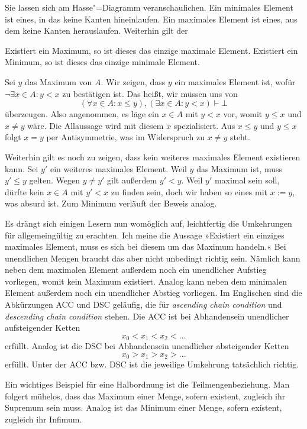 \noindent
Sie lassen sich am Hasse"=Diagramm veranschaulichen. Ein minimales
Element ist eines, in das keine Kanten hineinlaufen. Ein maximales
Element ist eines, aus dem keine Kanten herauslaufen. Weiterhin
gilt der

\begin{Satz}
Existiert ein Maximum, so ist dieses das einzige maximale Element.
Existiert ein Minimum, so ist dieses das einzige minimale Element.
\end{Satz}
\begin{Beweis}
Sei $y$ das Maximum von $A$. Wir zeigen, dass $y$ ein maximales
Element ist, wofür $\lnot\exists x\in A\colon y<x$ zu bestätigen ist.
Das heißt, wir müssen uns von
\[(\forall x\in A\colon x\le y),(\exists x\in A\colon y<x)\vdash\bot\]
überzeugen. Also angenommen, es läge ein $x\in A$ mit $y<x$ vor, womit
$y\le x$ und $x\ne y$ wäre. Die Allaussage wird mit diesem $x$
spezialisiert. Aus $x\le y$ und $y\le x$ folgt $x=y$ per Antisymmetrie,
was im Widerspruch zu $x\ne y$ steht.

Weiterhin gilt es noch zu zeigen, dass kein weiteres maximales
Element existieren kann. Sei $y'$ ein weiteres maximales Element.
Weil $y$ das Maximum ist, muss $y'\le y$ gelten. Wegen $y\ne y'$
gilt außerdem $y'<y$. Weil $y'$ maximal sein soll, dürfte kein $x\in A$
mit $y'<x$ zu finden sein, doch wir haben so eines mit $x:=y$, was
absurd ist. Zum Minimum verläuft der Beweis analog.\,\qedsymbol
\end{Beweis}

\noindent
Es drängt sich einigen Lesern nun womöglich auf, leichtfertig die
Umkehrungen für allgemeingültig zu erachten. Ich meine die Aussage
»Existiert ein einziges maximales Element, muss es sich bei diesem um
das Maximum handeln.« Bei unendlichen Mengen braucht das aber nicht
unbedingt richtig sein. Nämlich kann neben dem maximalen Element
außerdem noch ein unendlicher Aufstieg vorliegen, womit kein
Maximum existiert. Analog kann neben dem minimalen Element außerdem
noch ein unendlicher Abstieg vorliegen. Im Englischen sind die
Abkürzungen ACC und DSC geläufig, die für \emph{ascending chain condition}
und \emph{descending chain condition} stehen. Die ACC ist bei
Abhandensein unendlicher aufsteigender Ketten
\[x_0<x_1<x_2<\ldots\]
erfüllt. Analog ist die DSC bei Abhandensein unendlicher absteigender
Ketten
\[x_0>x_1>x_2>\ldots\]
erfüllt. Unter der ACC bzw. DSC ist die jeweilige Umkehrung tatsächlich
richtig.

Ein wichtiges Beispiel für eine Halbordnung ist die Teilmengenbeziehung.
Man folgert mühelos, dass das Maximum einer Menge, sofern existent,
zugleich ihr Supremum sein muss. Analog ist das Minimum einer Menge,
sofern existent, zugleich ihr Infimum.

